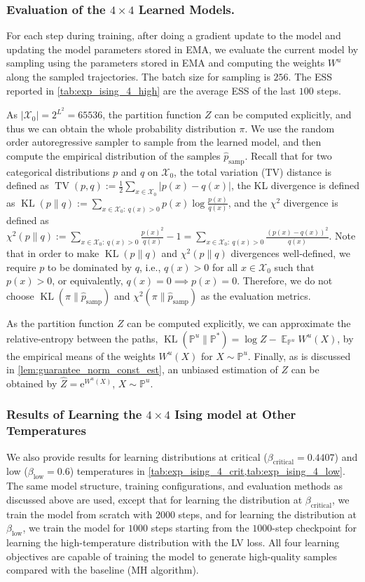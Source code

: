 \documentclass{article}
\theoremstyle{remark}
\newcommand{\e}{\mathrm{e}}
\renewcommand{\P}{\mathbb{P}}
\newcommand{\E}{\operatorname{\mathbb{E}}}
\newcommand{\kl}{\operatorname{KL}}
\newcommand{\tv}{\operatorname{TV}}
\newcommand{\cX}{\mathcal{X}}
\newcommand{\Zh}{\widehat{Z}}
\newcommand{\phsamp}{\widehat{p}_{\mathrm{samp}}}
\newcommand{\betac}{\beta_\mathrm{critical}}
\newcommand{\betal}{\beta_\mathrm{low}}
\begin{document}
%
%
%

\subsubsection{Evaluation of the $4\times4$ Learned Models.}
For each step during training, after doing a gradient update to the model and updating the model parameters stored in EMA, we evaluate the current model by sampling using the parameters stored in EMA and computing the weights $W^u$ along the sampled trajectories. The batch size for sampling is $256$. The ESS reported in \cref{tab:exp_ising_4_high} are the average ESS of the last $100$ steps.

As $|\cX_0|=2^{L^2}=65536$, the partition function $Z$ can be computed explicitly, and thus we can obtain the whole probability distribution $\pi$. We use the random order autoregressive sampler to sample from the learned model, and then compute the empirical distribution of the samples $\phsamp$. Recall that for two categorical distributions $p$ and $q$ on $\cX_0$, the total variation (TV) distance is defined as $\tv(p,q):=\frac{1}{2}\sum_{x\in\cX_0}|p(x)-q(x)|$, the KL divergence is defined as $\kl(p\|q):=\sum_{x\in\cX_0:~q(x)>0}p(x)\log\frac{p(x)}{q(x)}$, and the $\chi^2$ divergence is defined as $\chi^2(p\|q):=\sum_{x\in\cX_0:~q(x)>0}\frac{p(x)^2}{q(x)}-1=\sum_{x\in\cX_0:~q(x)>0}\frac{(p(x)-q(x))^2}{q(x)}$. Note that in order to make $\kl(p\|q)$ and $\chi^2(p\|q)$ divergences well-defined, we require $p$ to be dominated by $q$, i.e., $q(x)>0$ for all $x\in\cX_0$ such that $p(x)>0$, or equivalently, $q(x)=0\implies p(x)=0$. Therefore, we do not choose $\kl(\pi\|\phsamp)$ and $\chi^2(\pi\|\phsamp)$ as the evaluation metrics.

As the partition function $Z$ can be computed explicitly, we can approximate the relative-entropy between the paths, $\kl(\P^u\|\P^*)=\log Z-\E_{\P^u}W^u(X)$, by the empirical means of the weights $W^u(X)$ for $X\sim\P^u$. Finally, as is discussed in \cref{lem:guarantee_norm_const_est}, an unbiased estimation of $Z$ can be obtained by $\Zh=\e^{W^u(X)}$, $X\sim\P^u$.

\subsubsection{Results of Learning the $4\times 4$ Ising model at Other Temperatures}
We also provide results for learning distributions at critical ($\betac=0.4407$) and low ($\betal=0.6$) temperatures in \cref{tab:exp_ising_4_crit,tab:exp_ising_4_low}. The same model structure, training configurations, and evaluation methods as discussed above are used, except that for learning the distribution at $\betac$, we train the model from scratch with $2000$ steps, and for learning the distribution at $\betal$, we train the model for $1000$ steps starting from the $1000$-step checkpoint for learning the high-temperature distribution with the LV loss. All four learning objectives are capable of training the model to generate high-quality samples compared with the baseline (MH algorithm).
\end{document}
